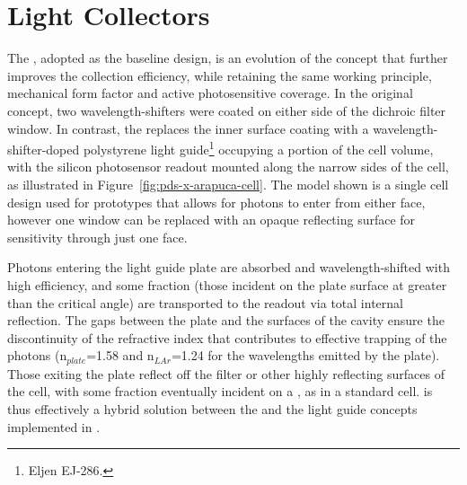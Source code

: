 

\section{Light Collectors}
\label{sec:fdsp-pd-lc}

The , adopted as the baseline design, is an evolution of the  concept that further improves the collection efficiency, while retaining the same working principle, mechanical form factor and active photosensitive coverage. 
 In the original  concept, two wavelength-shifters were coated on either side of the dichroic filter window. 
 In contrast, the  replaces the inner surface coating with a wavelength-shifter-doped %
 polystyrene light guide\footnote{Eljen EJ-286\texttrademark{}.} occupying a portion of the cell volume, with the silicon photosensor readout mounted along the narrow sides of the cell, as illustrated in Figure~\ref{fig:pds-x-arapuca-cell}. The model shown is a single cell design used for prototypes that allows for photons to enter from either face, however one window can be replaced with an opaque reflecting surface for sensitivity through just one face.

Photons entering the light guide plate are absorbed and wavelength-shifted with high efficiency, and some fraction (those incident on the plate surface at greater than the critical angle) are transported to the readout via total internal reflection. The  gaps between the plate and the surfaces of the cavity ensure the discontinuity of the refractive index that contributes to effective trapping of the photons (n$_{plate}$=1.58 and n$_{LAr}$=1.24 for the wavelengths emitted by the plate).
Those exiting the plate reflect off the filter or other highly reflecting surfaces of the cell, with some fraction eventually incident on a , as in a standard  cell.
 is thus effectively a hybrid solution between the  and the  light guide concepts implemented in .



